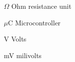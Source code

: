 \begin{listofsymbols}
  \item[$ \Omega $] Ohm resistance unit
  \item[$\mu$C] Microcontroller
  \item[V] Volts
  \item[mV] milivolts
\end{listofsymbols}
